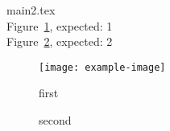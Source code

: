 \documentclass{article}
\begin{document}
{main2.tex}\\
Figure~\ref{fig:first}, expected: 1\\
Figure~\ref{fig:second}, expected: 2\\

\begin{figure}
  \texttt{[image: example-image]}
  \caption{first}
  \label{fig:first}
\end{figure}

\begin{figure}
  
  \caption{second}
  \label{fig:second}
\end{figure}
\end{document}

